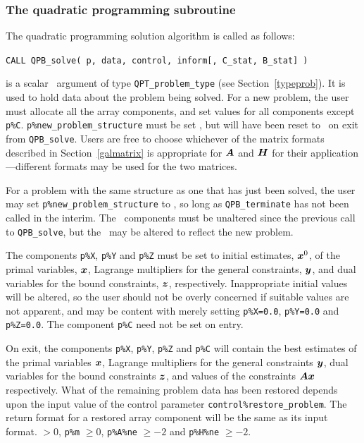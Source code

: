 \documentclass{galahad}
\newcommand{\packagename}{QPB}
\begin{document}

\subsubsection{The quadratic programming subroutine}
The quadratic programming solution algorithm is called as follows:
\vspace*{1mm}

\hspace{8mm}
{\tt CALL \packagename\_solve( p, data, control, inform[, C\_stat, B\_stat] )}

\vspace*{-3mm}
\begin{description}
 is a scalar \intentinout\ argument of type 
{\tt QPT\_problem\_type}
(see Section~\ref{typeprob}). 
It is used to hold data about the problem being solved.
For a new problem, the user must allocate all the array components,
and set values for all components except {\tt p\%C}.
{\tt p\%new\_problem\_structure} must be set \true, but will have been reset
to \false\ on exit from {\tt \packagename\_solve}.
Users are free to choose whichever
of the matrix formats described in Section~\ref{galmatrix} 
is appropriate for ${\bm{A}}$ and ${\bm{H}}$ for their application---different 
formats may be used for the two matrices.

For a problem with the same structure as one that has just been 
solved, the user may set {\tt p\%new\_problem\_str\-u\-cture} to \false,
so long as {\tt \packagename\_terminate} has not been called in the interim.
The \integer\ components must be unaltered since the
previous call to {\tt \packagename\_solve}, but the \realdp\ 
may be altered to reflect the new problem.

The components {\tt p\%X}, {\tt p\%Y} and {\tt p\%Z}
must be set to initial estimates, ${\bm{x}}^{0}$, of the primal variables, 
${\bm{x}}$, Lagrange multipliers for the general constraints, ${\bm{y}}$, 
and dual variables for the bound constraints, ${\bm{z}}$, respectively.
Inappropriate initial values will be altered, so the user should
not be overly concerned if suitable values are not apparent, and may be
content with merely setting {\tt p\%X=0.0},
{\tt p\%Y=0.0} and {\tt p\%Z=0.0}.
The component {\tt p\%C} need not be set on entry.

On exit, the components {\tt p\%X}, {\tt p\%Y}, {\tt p\%Z} and {\tt p\%C}
will contain the best estimates of the primal variables ${\bm{x}}$, 
Lagrange multipliers for the general
constraints ${\bm{y}}$, dual variables for the bound constraints ${\bm{z}}$, 
and values of the constraints ${\bm{A}} {\bm{x}}$ respectively.
What of the remaining problem data has been restored depends upon
the input value of the control parameter {\tt control\%restore\_problem}.
The return format for a restored array component will be the same as its
input format.
 $> 0$, {\tt p\%m} $\geq 0$,
              {\tt p\%A\%ne} $\geq -2$ and {\tt p\%H\%ne} $\geq -2$.


\end{description}
\end{document}
